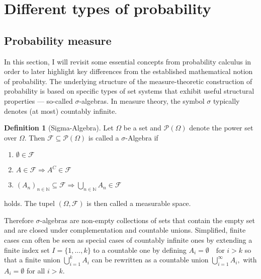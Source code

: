 \documentclass[
]{report}
\theoremstyle{definition}
\theoremstyle{definition}
\newtheorem{definition}{Definition}[section]
\begin{document}
\section{Different types of probability}

\subsection{Probability measure}

In this section, I will revisit some essential concepts from probability
calculus in order to later highlight key differences from the
established mathematical notion of probability. The underlying structure
of the measure-theoretic construction of probability is based on
specific types of set systems that exhibit useful structural properties
--- so-called \(\sigma\)-algebras. In measure theory, the symbol
\(\sigma\) typically denotes (at most) countably infinite.

\begin{definition}[Sigma-Algebra]
Let $\Omega$ be a set and $\mathcal{P}(\Omega)$ denote the power set over $\Omega$. Then $\mathcal{F} \subseteq \mathcal{P}(\Omega)$ is called a $\sigma$-Algebra if 
\begin{enumerate}
  \item $\emptyset \in  \mathcal{F}$
  \item $A \in \mathcal{F} \Rightarrow A^C \in \mathcal{F}$
  \item $(A_n)_{n \in \mathbb{N}} \subseteq \mathcal{F} \Rightarrow \displaystyle\bigcup_{n \in \mathbb{N}} A_n \in \mathcal{F}$
\end{enumerate}
holds. The tupel $(\Omega, \mathcal{F})$ is then called a {measurable space}.
\end{definition}

Therefore \(\sigma\)-algebras are non-empty collections of sets that
contain the empty set and are closed under complementation and countable
unions. Simplified, finite cases can often be seen as special cases of
countably infinite ones by extending a finite index set
\(I = \{1, \dots, k \}\) to a countable one by defining
\(A_i = \emptyset \quad \text{for } i > k\) so that a finite union
\(\bigcup_{i=1}^{k} A_i\) can be rewritten as a countable union
\(\bigcup_{i=1}^{\infty} A_i,\) with \(A_i = \emptyset\) for all
\(i > k\).
\end{document}
